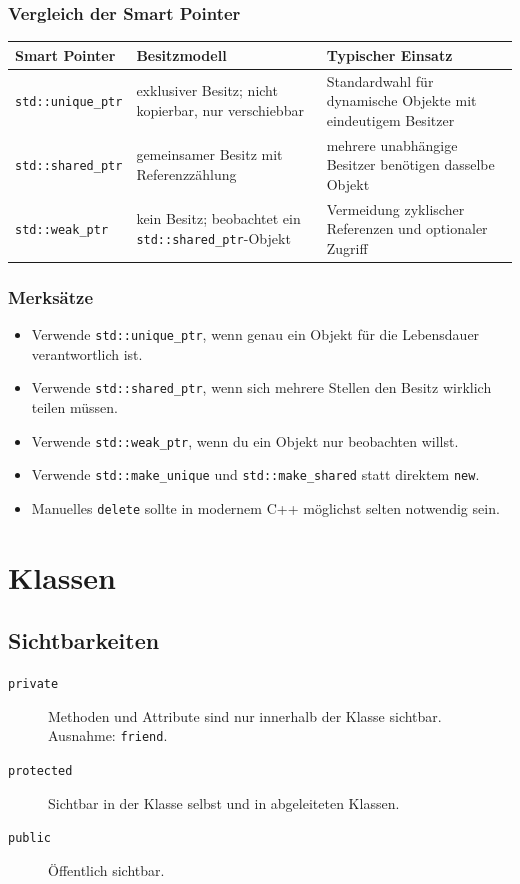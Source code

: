 \documentclass[11pt,a4paper]{article}
\newcommand{\code}[1]{\texttt{#1}}
\begin{document}
\subsubsection{Vergleich der Smart Pointer}
\begin{center}
\begin{tabular}{p{3.2cm}p{5.4cm}p{5.2cm}}
\toprule
Smart Pointer & Besitzmodell & Typischer Einsatz \\
\midrule
\code{std::unique\_ptr} & exklusiver Besitz; nicht kopierbar, nur verschiebbar & Standardwahl für dynamische Objekte mit eindeutigem Besitzer \\
\code{std::shared\_ptr} & gemeinsamer Besitz mit Referenzzählung & mehrere unabhängige Besitzer benötigen dasselbe Objekt \\
\code{std::weak\_ptr} & kein Besitz; beobachtet ein \code{std::shared\_ptr}-Objekt & Vermeidung zyklischer Referenzen und optionaler Zugriff \\
\bottomrule
\end{tabular}
\end{center}

\subsubsection{Merksätze}
\begin{itemize}
  \item Verwende \code{std::unique\_ptr}, wenn genau ein Objekt für die Lebensdauer verantwortlich ist.
  \item Verwende \code{std::shared\_ptr}, wenn sich mehrere Stellen den Besitz wirklich teilen müssen.
  \item Verwende \code{std::weak\_ptr}, wenn du ein Objekt nur beobachten willst.
  \item Verwende \code{std::make\_unique} und \code{std::make\_shared} statt direktem \code{new}.
  \item Manuelles \code{delete} sollte in modernem C++ möglichst selten notwendig sein.
\end{itemize}

\section{Klassen}

\subsection{Sichtbarkeiten}
\begin{description}
  \item[\code{private}] Methoden und Attribute sind nur innerhalb der Klasse sichtbar. Ausnahme: \code{friend}.
  \item[\code{protected}] Sichtbar in der Klasse selbst und in abgeleiteten Klassen.
  \item[\code{public}] Öffentlich sichtbar.
\end{description}
\end{document}
